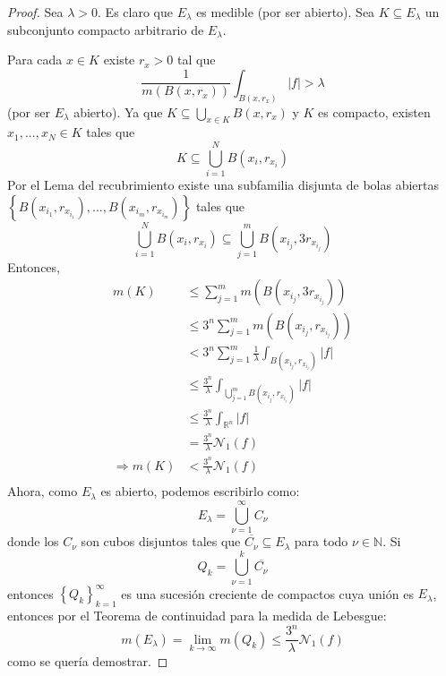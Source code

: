 \documentclass[12pt]{report}
\newcounter{it}
\theoremstyle{largebreak}
\renewcommand{\leq}{\ensuremath{\leqslant}}
\newcommand\abs[1]{\ensuremath{\left|#1\right|}}
\newcommand{\N}[2]{\ensuremath{\mathcal{N}_{#1}\left(#2\right)}}
\begin{document}
    \begin{proof}
        Sea $\lambda>0$. Es claro que $E_\lambda$ es medible (por ser abierto). Sea $K\subseteq E_\lambda$ un subconjunto compacto arbitrario de $E_\lambda$.

        Para cada $x\in K$ existe $r_x>0$ tal que
        \begin{equation*}
            \frac{1}{m(B(x,r_x))}\int_{B(x,r_x)}\abs{f}>\lambda
        \end{equation*}
        (por ser $E_\lambda$ abierto). Ya que $K\subseteq \bigcup_{ x\in K}B(x,r_x)$ y $K$ es compacto, existen $x_1,...,x_N\in K$ tales que
        \begin{equation*}
            K\subseteq \bigcup_{ i=1}^N B(x_i,r_{ x_i})
        \end{equation*}
        Por el Lema del recubrimiento existe una subfamilia disjunta de bolas abiertas $\left\{B(x_{ i_1},r_{ x_{i_1}}),...,B(x_{ i_m},r_{ x_{i_m}})\right\}$ tales que
        \begin{equation*}
            \bigcup_{ i=1}^N B(x_i,r_{ x_i})\subseteq\bigcup_{ j=1}^{ m}B(x_{ i_j},3r_{x_{ i_j}} )
        \end{equation*}
        Entonces,
        \begin{equation*}
            \begin{split}
                m(K)&\leq\sum_{ j=1}^m m(B(x_{ i_j},3r_{x_{ i_j}})) \\
                &\leq3^n\sum_{ j=1}^m m(B(x_{ i_j},r_{x_{ i_j}})) \\
                &<3^n\sum_{ j=1}^m \frac{1}{\lambda}\int_{ B(x_{ i_j},r_{x_{ i_j}})}\abs{f}\\
                &\leq\frac{3^n}{\lambda}\int_{\bigcup_{ j=1}^{ m}B(x_{ i_j},r_{x_{ i_j}})}\abs{f}\\
                &\leq\frac{3^n}{\lambda}\int_{\mathbb{R}^n}\abs{f}\\
                &=\frac{3^n}{\lambda}\N{1}{f}\\
                \Rightarrow m(K)&<\frac{3^n}{\lambda}\N{1}{f}\\
            \end{split}
        \end{equation*}
        Ahora, como $E_\lambda$ es abierto, podemos escribirlo como:
        \begin{equation*}
            E_\lambda=\bigcup_{ \nu=1}^\infty C_{\nu}
        \end{equation*}
        donde los $C_\nu$ son cubos disjuntos tales que $\overline{C_\nu}\subseteq E_\lambda$ para todo $\nu\in\mathbb{N}$. Si
        \begin{equation*}
            Q_k=\bigcup_{ \nu=1}^k\overline{C_\nu}
        \end{equation*}
        entonces $\left\{Q_k \right\}_{ k=1}^\infty$ es una sucesión creciente de compactos cuya unión es $E_\lambda$, entonces por el Teorema de continuidad para la medida de Lebesgue:
        \begin{equation*}
            m(E_\lambda)=\lim_{ k\rightarrow\infty}m(Q_k)\leq\frac{3^n}{\lambda}\N{1}{f}
        \end{equation*}
        como se quería demostrar.
    \end{proof}
\end{document}

